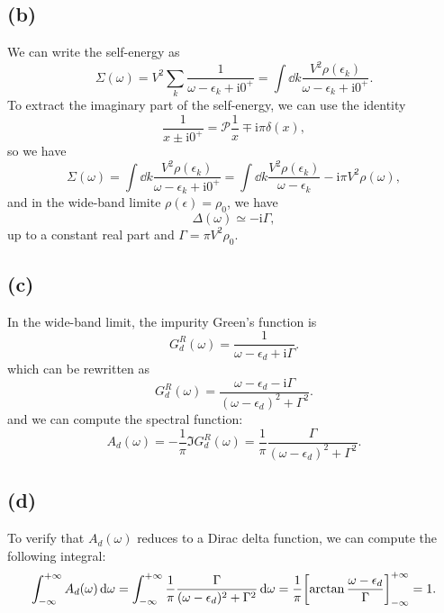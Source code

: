 \documentclass{article}
\newcommand{\ii}{\mathrm{i}}
\begin{document}
\subsection*{(b)}
We can write the self-energy as
\begin{equation}
    \Sigma(\omega)=V^2\sum_k \frac{1}{\omega-\epsilon_k+ \ii 0^+}=\int \dd{k}\frac{V^2 \rho(\epsilon_k)}{\omega-\epsilon_k+ \ii 0^+}.
\end{equation}
To extract the imaginary part of the self-energy, we can use the identity
\begin{equation}
    \frac{1}{x\pm \ii 0^+}=\mathcal{P}\frac{1}{x}\mp \ii \pi \delta(x),
\end{equation}
so we have
\begin{equation}
    \Sigma(\omega)=\int \dd{k}\frac{V^2 \rho(\epsilon_k)}{\omega-\epsilon_k+ \ii 0^+}=\int \dd{k}\frac{V^2 \rho(\epsilon_k)}{\omega-\epsilon_k}-\ii \pi V^2 \rho(\omega),
\end{equation}
and in the wide-band limite $\rho(\epsilon)=\rho_0$, we have
\begin{equation}
    \Delta(\omega)\simeq -\ii\Gamma,
\end{equation}
up to a constant real part and $\Gamma=\pi V^2 \rho_0$.

\subsection*{(c)}
In the wide-band limit, the impurity Green's function is
\begin{equation}
    G^R_d(\omega)=\frac{1}{\omega-\epsilon_d+\ii \Gamma}.
\end{equation}
which can be rewritten as 
\begin{equation}
    G^R_d(\omega)=\frac{\omega-\epsilon_d-\ii \Gamma}{(\omega-\epsilon_d)^2+\Gamma^2}.
\end{equation}
and we can compute the spectral function: 
\begin{equation}
    A_d(\omega)=-\frac{1}{\pi}\Im G^R_d(\omega)=\frac{1}{\pi}\frac{\Gamma}{(\omega-\epsilon_d)^2+\Gamma^2}.
\end{equation}

\subsection*{(d)}
To verify that $A_d(\omega)$ reduces to a Dirac delta function, we can compute the following integral:
\begin{equation}
    \int_{-\infty}^{+\infty} A_d(\omega)\dd{\omega}=\int_{-\infty}^{+\infty}\frac{1}{\pi}\frac{\Gamma}{(\omega-\epsilon_d)^2+\Gamma^2}\dd{\omega}=\frac{1}{\pi}\qty[\arctan\frac{\omega-\epsilon_d}{\Gamma}]_{-\infty}^{+\infty}=1. 
\end{equation}

%
%
\end{document}
